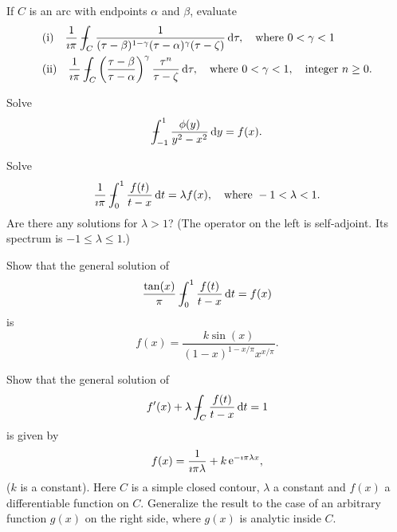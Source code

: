 \begin{Exercise}
  If $C$ is an arc with endpoints $\alpha$ and $\beta$, evaluate
  \begin{align*}
    &\mathrm{(i)} \quad
    \frac{1}{\imath \pi} \pv\int_C \frac{1}{(\tau-\beta)^{1-\gamma}
      (\tau - \alpha)^\gamma (\tau - \zeta) } \,\dd \tau, \quad
    \mathrm{where}\ 0 < \gamma < 1 \\
    &\mathrm{(ii)} \quad
    \frac{1}{\imath \pi} \pv\int_C \left( \frac{\tau - \beta}{\tau - \alpha}
    \right)^\gamma \frac{\tau^n}{\tau - \zeta} \,\dd \tau,
    \quad \mathrm{where}\ 0 < \gamma < 1, \quad \mathrm{integer}\ n \geq 0.
  \end{align*}
\end{Exercise}



\begin{Exercise}
  Solve
  \[
  - \negthickspace \negthickspace \negthickspace \negmedspace\int_{-1}^1 \frac{\phi(y)}{y^2 - x^2} \,\mathrm{d} y = f(x).
  \]
\end{Exercise}



\begin{Exercise}
  Solve
  \[
  \frac{1}{\imath \pi} - \negthickspace \negthickspace \negthickspace \negmedspace\int_0^1 \frac{f(t)}{t-x} \,\mathrm{d} t = \lambda f(x), \quad
  \mathrm{where}\ -1 < \lambda < 1.
  \]
  Are there any solutions for $\lambda > 1$?  (The operator on the left is 
  self-adjoint.  Its spectrum is $-1 \leq \lambda \leq 1$.)
\end{Exercise}



\begin{Exercise}
  Show that the general solution of
  \[
  \frac{\tan(x)}{\pi} - \negthickspace \negthickspace \negthickspace \negmedspace\int_0^1 \frac{ f(t) }{ t-x } \,\mathrm{d} t = f(x)
  \]
  is
  \[
  f(x) = \frac{ k \sin(x) }{ (1-x)^{1-x/\pi} x^{x/\pi} }.
  \]
\end{Exercise}



\begin{Exercise}
  Show that the general solution of 
  \[
  f'(x) + \lambda - \negthickspace \negthickspace \negthickspace \negmedspace\int_C \frac{f(t)}{t-x}\,\mathrm{d} t = 1
  \]
  is given by
  \[
  f(x) = \frac{1}{\imath \pi \lambda} + k \mathop{\mathrm{e}}\nolimits^{-\imath \pi \lambda x},
  \]
  ($k$ is a constant).  Here $C$ is a simple closed contour, $\lambda$ a
  constant and $f(x)$ a differentiable function on $C$.  Generalize the result
  to the case of an arbitrary function $g(x)$ on the right side, where
  $g(x)$ is analytic inside $C$.
\end{Exercise}



